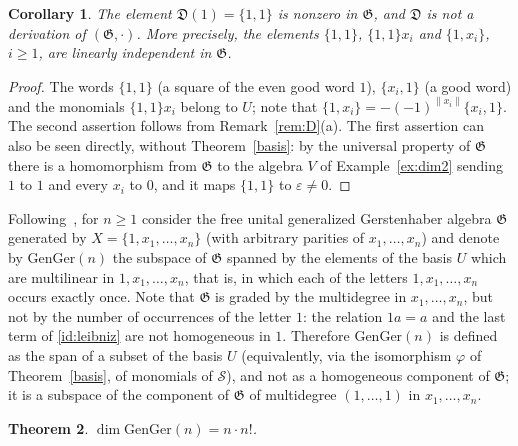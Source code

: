 \documentclass[11pt,reqno]{amsart}
\newcommand{\G}{\mathfrak G}
\newcommand{\D}{\mathfrak D}
\newcommand{\Sm}{\mathcal S}
\newcommand{\rp}[1]{\|#1\|}
\theoremstyle{plain}
\newtheorem{theorem}{Theorem}
\newtheorem{corollary}[theorem]{Corollary}
\theoremstyle{definition}
\theoremstyle{remark}
\begin{document}
\begin{corollary}\label{cor:11}
The element $\D(1)=\{1,1\}$ is nonzero in $\G$, and $\D$ is not a derivation of $(\G,\cdot)$.
More precisely, the elements $\{1,1\}$, $\{1,1\}x_i$ and $\{1,x_i\}$, $i\ge1$, are linearly independent in $\G$.
\end{corollary}

\begin{proof}
The words $\{1,1\}$ (a square of the even good word $1$), $\{x_i,1\}$ (a good word) and the monomials $\{1,1\}x_i$ belong to $U$; note that $\{1,x_i\}=-(-1)^{\rp{x_i}}\{x_i,1\}$.
The second assertion follows from Remark~\ref{rem:D}(a).
The first assertion can also be seen directly, without Theorem~\ref{basis}: by the universal property of $\G$ there is a homomorphism from $\G$ to the algebra $V$ of Example~\ref{ex:dim2} sending $1$ to $1$ and every $x_i$ to $0$, and it maps $\{1,1\}$ to $\varepsilon\ne0$.
\end{proof}

Following~\cite{K17}, for $n\ge1$ consider the free unital generalized Gerstenhaber algebra $\G$ generated by $X=\{1,x_1,\dots,x_n\}$ (with arbitrary parities of $x_1,\dots,x_n$) and denote by $\mathrm{GenGer}(n)$ the subspace of $\G$ spanned by the elements of the basis $U$ which are multilinear in $1,x_1,\dots,x_n$, that is, in which each of the letters $1,x_1,\dots,x_n$ occurs exactly once.
Note that $\G$ is graded by the multidegree in $x_1,\dots,x_n$, but not by the number of occurrences of the letter $1$: the relation $1a=a$ and the last term of \eqref{id:leibniz} are not homogeneous in $1$.
Therefore $\mathrm{GenGer}(n)$ is defined as the span of a subset of the basis $U$ (equivalently, via the isomorphism $\varphi$ of Theorem~\ref{basis}, of monomials of $\Sm$), and not as a homogeneous component of $\G$; it is a subspace of the component of $\G$ of multidegree $(1,\dots,1)$ in $x_1,\dots,x_n$.

\begin{theorem}\label{dimen}
$\dim\mathrm{GenGer}(n)=n\cdot n!$.
\end{theorem}
\end{document}

